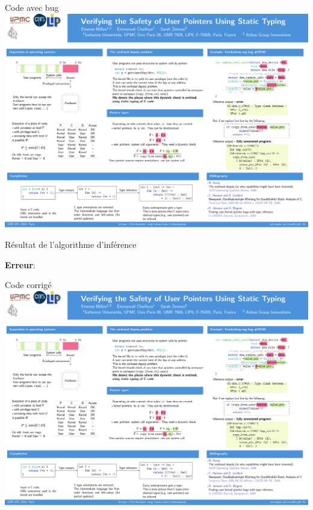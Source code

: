 \documentclass{beamer}
\def\codeout#1{
    \begin{center}
    \fboxsep=2mm
    \colorbox{codeoutcol}{\BUseVerbatim{#1}}
    \end{center}
}
\begin{document}
\begin{frame}{Code avec bug}
    \includegraphics[trim=2300 1430 100 500,clip,width=\textwidth]{poster.pdf}
\end{frame}

\begin{frame}[fragile]{Résultat de l'algorithme d'inférence}

\textbf{Erreur}:

\codeout{drmko} %
\end{frame}

\begin{frame}{Code corrigé}
    \includegraphics[trim=2300 990 100 1220,clip,width=\textwidth]{poster.pdf}
\end{frame}
\end{document}
